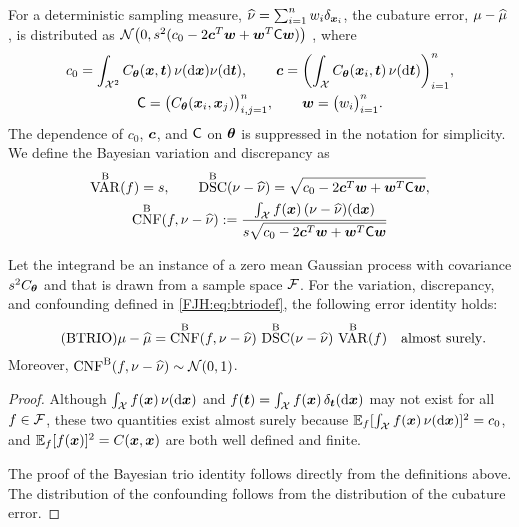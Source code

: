 \documentclass[graybox,footinfo]{svmult}
\DeclareMathOperator{\algn}{CNF}
\DeclareMathOperator{\disc}{DSC}
\DeclareMathOperator{\Var}{VAR}
\begin{document}
For a 
deterministic sampling measure, $\widehat{\nu} = \sum_{i=1}^n w_i \delta_{{\boldsymbol{x}}_i}$, the cubature 
error, $\mu - \widehat{\mu}$, is distributed as ${\mathcal{N}} \bigl(0 , s^2(c_0 - 
2 {\boldsymbol{c}}^T {\boldsymbol{w}} + {\boldsymbol{w}} ^T \mathsf{C} {\boldsymbol{w}}) \bigr)$ \cite{??}, where 
\begin{subequations} \label{FJH:eq:Cvecmatdef}
\begin{gather}
c_0  = \int_{{\mathcal{X}}^2} C_{\boldsymbol{\theta}}({\boldsymbol{x}},{\boldsymbol{t}}) \, \nu(\mathrm{d} {\boldsymbol{x}}) \nu(\mathrm{d} {\boldsymbol{t}}), \qquad {\boldsymbol{c}} = 
\biggl( 
\int_{{\mathcal{X}}} 
C_{\boldsymbol{\theta}}({\boldsymbol{x}}_i,{\boldsymbol{t}}) \,\nu(\mathrm{d} {\boldsymbol{t}}) \biggr)_{i=1}^n, \\
\mathsf{C}  = \bigl( C_{\boldsymbol{\theta}}({\boldsymbol{x}}_i,{\boldsymbol{x}}_j) \bigr)_{i,j=1}^n, \qquad {\boldsymbol{w}} = \bigl(w_i 
\bigr)_{i=1}^n.
\end{gather}
\end{subequations}
The dependence of $c_0$, ${\boldsymbol{c}}$, and $\mathsf{C}$ on ${\boldsymbol{\theta}}$ is suppressed in the 
notation for simplicity. We 
define the Bayesian variation and discrepancy as 
\begin{subequations} \label{FJH:eq:btriodef}
\begin{gather}
\label{FJH:eq:btriodefa}
\Var^{\Ba}(f)  = s, \qquad \disc^{\Ba}(\nu - \hnu) = \sqrt{c_0 - 
	2 \bsc^T \bsw + \bsw ^T \mC \bsw},\\
\algn^{\Ba}(f,\nu - \hnu) :=\frac{ \int_{\calX} 
	f(\bsx) \, (\nu - \hnu)(\D\bsx)}{s \sqrt{c_0 - 2 \bsc^T \bsw + \bsw ^T \mC \bsw}}
\end{gather}
\end{subequations}

\begin{theorem}  \label{FJH:thm:btrio} Let the integrand be 
an instance of a zero mean Gaussian process with covariance $s^2C_{{\boldsymbol{\theta}}}$ and 
that is drawn from a sample space 
${\mathcal{F}}$.  For the  variation, discrepancy, and 
	confounding defined in \eqref{FJH:eq:btriodef}, the following error identity holds: 
	\begin{equation} \tag{BTRIO} \label{FJH:eq:btrio}
	\mu - \hmu  = \algn^\Ba(f,\nu - \hnu) \, \disc^\Ba(\nu - \hnu) \, \Var^{\Ba}(f) \quad 
	\text{almost surely}.
	\end{equation}
	Moreover, $\algn^\Ba(f,\nu - \hnu) \sim \calN(0,1)$. 
\end{theorem}
\begin{proof}  Although $\int_{{\mathcal{X}}} f({\boldsymbol{x}}) \, \nu(\mathrm{d} {\boldsymbol{x}})$ and $f({\boldsymbol{t}}) = \int_{{\mathcal{X}}} 
f({\boldsymbol{x}}) \, \delta_{\boldsymbol{t}} (\mathrm{d} {\boldsymbol{x}})$ may not exist for all $f \in {\mathcal{F}}$, these two quantities 
exist 
almost surely because ${\mathbb{E}}_f [\int_{{\mathcal{X}}} f({\boldsymbol{x}}) \, \nu(\mathrm{d} {\boldsymbol{x}})]^2 = c_0$, and 
${\mathbb{E}}_f [f({\boldsymbol{x}})]^2 = C({\boldsymbol{x}},{\boldsymbol{x}})$ are both well defined and finite.

The proof of the Bayesian trio identity follows directly from the definitions above.  The 
distribution of the confounding follows from the distribution of the cubature error.
\end{proof}
\end{document}

